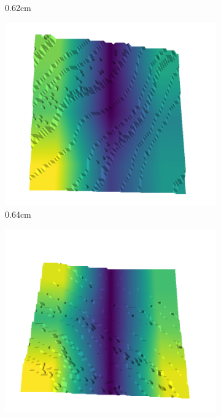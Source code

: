 \documentclass[../document.tex]{subfiles}
\begin{document}
\begin{figure}[H]
\begin{subfigure}[b]{0.192\linewidth}
    \caption{0.62cm}
    \label{fig : quarry-best-14}
    \end{subfigure}
    \begin{subfigure}[b]{0.192\linewidth}
    \includegraphics[width=\linewidth]{../img/5/quarry/best/63-patch-3d-majavi-colormap-150.png}
    \caption{0.64cm}
    \label{fig : quarry-best-15}
    \end{subfigure}
    \begin{subfigure}[b]{0.192\linewidth}
    \includegraphics[width=\linewidth]{../img/5/quarry/best/65-patch-3d-majavi-colormap-160.png}

\end{subfigure}
\end{figure}
\end{document}
